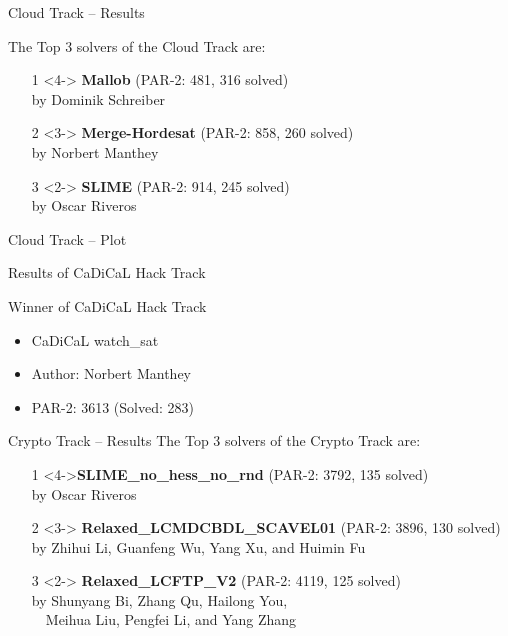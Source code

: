 \documentclass[trans]{beamer}
\begin{document}

\begin{frame}{Cloud Track -- Results}

The Top 3 solvers of the Cloud Track are:
\begin{itemize}

\item[1]<4-> {\bf Mallob} (PAR-2: 481, 316 solved)\\
by Dominik Schreiber
\item[2]<3-> {\bf Merge-Hordesat} (PAR-2: 858, 260 solved)\\
by Norbert Manthey
\item[3]<2-> {\bf SLIME} (PAR-2: 914, 245 solved)\\
by Oscar Riveros
\end{itemize}
\end{frame}


\begin{frame}{Cloud Track -- Plot}
\centering
\resizebox{.9\textwidth}{!}{%

}
\end{frame}


\begin{frame}{Results of CaDiCaL Hack Track}
\begin{block}{Winner of CaDiCaL Hack Track}
\begin{itemize}
\item<2> CaDiCaL watch\_sat 
\item<2> Author: Norbert Manthey
\item<2> PAR-2: 3613 (Solved: 283)
\end{itemize}
\end{block}
\end{frame}


\begin{frame}{Crypto Track -- Results}
The Top 3 solvers of the Crypto Track are:
\begin{itemize}
\item[1]<4->{\bf SLIME\_no\_hess\_no\_rnd} (PAR-2: 3792, 135 solved)\\
by Oscar Riveros
\item[2]<3-> {\bf Relaxed\_LCMDCBDL\_SCAVEL01} (PAR-2: 3896, 130 solved)\\
by Zhihui Li, Guanfeng Wu, Yang Xu, and Huimin Fu
\item[3]<2-> {\bf Relaxed\_LCFTP\_V2} (PAR-2: 4119, 125 solved)\\
by Shunyang Bi, Zhang Qu, Hailong You, \\~~Meihua Liu, Pengfei Li, and Yang Zhang
\end{itemize}

\end{frame}
\end{document}
